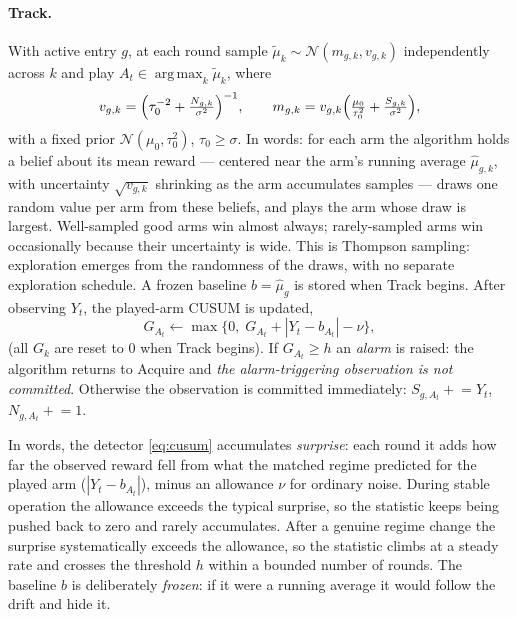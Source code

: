 \documentclass[11pt]{article}
\newcommand{\argmax}{\operatorname*{arg\,max}}
\begin{document}
\paragraph{Track.}
With active entry $g$, at each round sample $\widetilde\mu_k\sim\mathcal N(m_{g,k},v_{g,k})$ independently across $k$ and play $A_t\in\argmax_k\widetilde\mu_k$, where
\begin{equation}
    v_{g,k}=\Bigl(\tau_0^{-2}+\tfrac{N_{g,k}}{\sigma^2}\Bigr)^{-1},
    \qquad
    m_{g,k}=v_{g,k}\Bigl(\tfrac{\mu_0}{\tau_0^2}+\tfrac{S_{g,k}}{\sigma^2}\Bigr),
    \label{eq:posterior}
\end{equation}
with a fixed prior $\mathcal N(\mu_0,\tau_0^2)$, $\tau_0\ge\sigma$. In words: for each arm the algorithm holds a belief about its mean reward --- centered near the arm's running average $\widehat\mu_{g,k}$, with uncertainty $\sqrt{v_{g,k}}$ shrinking as the arm accumulates samples --- draws one random value per arm from these beliefs, and plays the arm whose draw is largest. Well-sampled good arms win almost always; rarely-sampled arms win occasionally because their uncertainty is wide. This is Thompson sampling: exploration emerges from the randomness of the draws, with no separate exploration schedule. A frozen baseline $b=\widehat\mu_g$ is stored when Track begins. After observing $Y_t$, the played-arm CUSUM is updated,
\begin{equation}
    G_{A_t}\leftarrow\max\{0,\;G_{A_t}+|Y_t-b_{A_t}|-\nu\},
    \label{eq:cusum}
\end{equation}
(all $G_k$ are reset to $0$ when Track begins). If $G_{A_t}\ge h$ an \emph{alarm} is raised: the algorithm returns to Acquire and \emph{the alarm-triggering observation is not committed}. Otherwise the observation is committed immediately: $S_{g,A_t}\mathrel{+}=Y_t$, $N_{g,A_t}\mathrel{+}=1$.

In words, the detector \eqref{eq:cusum} accumulates \emph{surprise}: each round it adds how far the observed reward fell from what the matched regime predicted for the played arm ($|Y_t-b_{A_t}|$), minus an allowance $\nu$ for ordinary noise. During stable operation the allowance exceeds the typical surprise, so the statistic keeps being pushed back to zero and rarely accumulates. After a genuine regime change the surprise systematically exceeds the allowance, so the statistic climbs at a steady rate and crosses the threshold $h$ within a bounded number of rounds. The baseline $b$ is deliberately \emph{frozen}: if it were a running average it would follow the drift and hide it.
\end{document}
